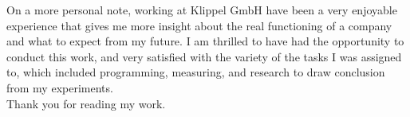 \documentclass{report}
\begin{document}

On a more personal note, working at Klippel GmbH have been a very enjoyable experience that gives me more insight about the real functioning of a company and what to expect from my future. I am thrilled to have had the opportunity to conduct this work, and very satisfied with the variety of the tasks I was assigned to, which included programming, measuring, and research to draw conclusion from my experiments. \\

Thank you for reading my work.

\renewcommand{\bibname}{References}



\nocite{*}

\end{document}
